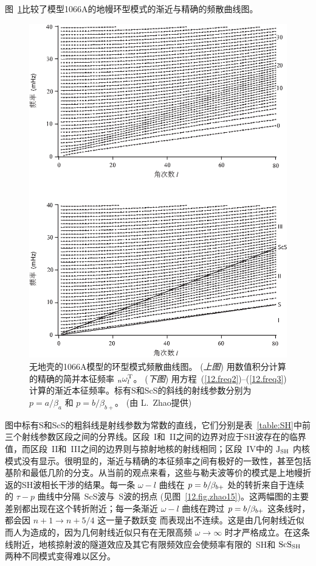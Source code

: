 图~\ref{12.fig.zhao16}比较了模型1066A的地幔环型模式的渐近与精确的频散曲线图。
\begin{figure}[!t]
\begin{center}
\includegraphics{../figures/chap12/fig11.eps}
\end{center}
\caption[ToroidalDispersion]{\label{12.fig.zhao16}
无地壳的1066A模型的环型模式频散曲线图。
({\em 上图\/}) 用数值积分计算的精确的简并本征频率 ${}_n\omega_l^{\rm T}$。
({\em 下图\/}) 用方程~(\ref{12.freq2})--(\ref{12.freq3}) 计算的渐近本征频率。标有S和ScS的斜线的射线参数分别为 
$p=a/\beta_a$ 和 $p=b/\beta_{b+}$。  (由 L.\ Zhao提供)}
\end{figure}
图中标有S和ScS的粗斜线是射线参数为常数的直线，它们分别是表~\ref{table:SH}中前三个射线参数区段之间的分界线。区段~I和~II之间的边界对应于SH波存在的临界值，而区段~II和~III之间的边界则与掠射地核的射线相同；区段~IV中的 ${\rm J}_{\rm SH}$ 内核模式没有显示。很明显的，渐近与精确的本征频率之间有极好的一致性，甚至包括基阶和最低几阶的分支。从当前的观点来看，这些与勒夫波等价的模式是上地幔折返的SH波相长干涉的结果。每一条 $\omega\!-\!l$ 曲线在 $p=b/\hspace{-0.2 mm}\beta_{b+}$ 处的转折来自于连续的 $\tau\!-\!p$ 曲线中分隔~ScS波与~S波的拐点 (见图~\ref{12.fig.zhao15})。这两幅图的主要差别都出现在这个转折附近；每一条渐近 $\omega\!-\!l$ 曲线在跨过 $p=b/\hspace{-0.2 mm}\beta_{b+}$ 这条线时，都会因 $n+1\rightarrow n+5/4$ 这一量子数跃变 而表现出不连续。这是由几何射线近似而人为造成的，因为几何射线近似只有在无限高频 $\omega\rightarrow\infty$ 时才严格成立。在这条线附近，地核掠射波的隧道效应及其它有限频效应会使频率有限的~SH和 ${\rm ScS}_{\rm SH}$ 两种不同模式变得难以区分。

